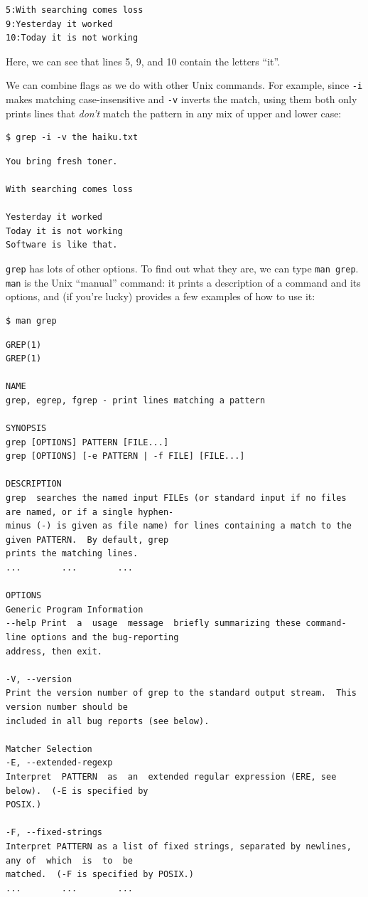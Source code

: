 \documentclass{book}
\begin{document}
\begin{verbatim}
5:With searching comes loss
9:Yesterday it worked
10:Today it is not working
\end{verbatim}

Here, we can see that lines 5, 9, and 10 contain the letters ``it''.

We can combine flags as we do with other Unix commands. For example,
since \texttt{-i} makes matching case-insensitive and \texttt{-v}
inverts the match, using them both only prints lines that \emph{don't}
match the pattern in any mix of upper and lower case:

\begin{verbatim}
$ grep -i -v the haiku.txt
\end{verbatim}

\begin{verbatim}
You bring fresh toner.

With searching comes loss

Yesterday it worked
Today it is not working
Software is like that.
\end{verbatim}

\texttt{grep} has lots of other options. To find out what they are, we
can type \texttt{man grep}. \texttt{man} is the Unix ``manual'' command:
it prints a description of a command and its options, and (if you're
lucky) provides a few examples of how to use it:

\begin{verbatim}
$ man grep
\end{verbatim}

\begin{verbatim}
GREP(1)                                                                                              GREP(1)

NAME
grep, egrep, fgrep - print lines matching a pattern

SYNOPSIS
grep [OPTIONS] PATTERN [FILE...]
grep [OPTIONS] [-e PATTERN | -f FILE] [FILE...]

DESCRIPTION
grep  searches the named input FILEs (or standard input if no files are named, or if a single hyphen-
minus (-) is given as file name) for lines containing a match to the given PATTERN.  By default, grep
prints the matching lines.
...        ...        ...

OPTIONS
Generic Program Information
--help Print  a  usage  message  briefly summarizing these command-line options and the bug-reporting
address, then exit.

-V, --version
Print the version number of grep to the standard output stream.  This version number should be
included in all bug reports (see below).

Matcher Selection
-E, --extended-regexp
Interpret  PATTERN  as  an  extended regular expression (ERE, see below).  (-E is specified by
POSIX.)

-F, --fixed-strings
Interpret PATTERN as a list of fixed strings, separated by newlines, any of  which  is  to  be
matched.  (-F is specified by POSIX.)
...        ...        ...
\end{verbatim}
\end{document}

